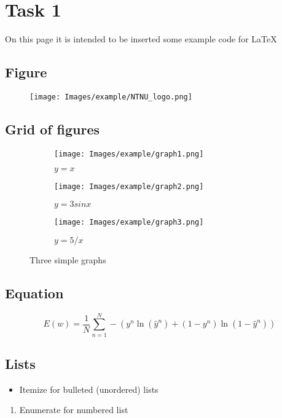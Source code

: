 \section*{Task 1}

On this page it is intended to be inserted some example code for LaTeX

\subsection*{Figure}
\begin{figure}[h!]
    \centering
    \texttt{[image: Images/example/NTNU\_logo.png]}
\end{figure}

\subsection*{Grid of figures}
\begin{figure}[h!]
    \centering
    \begin{subfigure}[b]{0.3\textwidth}
        \centering
        \texttt{[image: Images/example/graph1.png]}
        \caption{$y=x$}
        \label{fig:y equals x}
    \end{subfigure}
    \hfill
    \begin{subfigure}[b]{0.3\textwidth}
        \centering
        \texttt{[image: Images/example/graph2.png]}
        \caption{$y=3sinx$}
        \label{fig:three sin x}
    \end{subfigure}
    \hfill
    \begin{subfigure}[b]{0.3\textwidth}
        \centering
        \texttt{[image: Images/example/graph3.png]}
        \caption{$y=5/x$}
        \label{fig:five over x}
    \end{subfigure}
       \caption{Three simple graphs}
       \label{fig:three_graphs}
\end{figure}

\subsection*{Equation}
\begin{equation*}
    E\left( w\right) =\dfrac{1}{N}\sum ^{N}_{n=1}-\left( y^{n}\ln \left( \hat{y}^{n}\right) +\left( 1-y^{n}\right) \ln \left( 1-\hat{y}^{n}\right) \right) 
\end{equation*}

\subsection*{Lists}
\begin{itemize}
    \item Itemize for bulleted (unordered) lists
  \end{itemize}
\begin{enumerate}
    \item Enumerate for numbered list
\end{enumerate}

